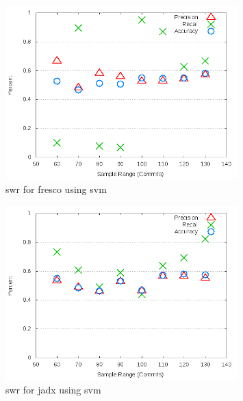 \begin{figure}[!t]
\centering
\includegraphics[width=0.8\textwidth]{images/svm/test_1/fresco_sample_range.png}
\caption{\gls{swr} for fresco using \gls{svm}}
\label{fig:test_1_fresco_svm}
\end{figure}

\begin{figure}[!t]
\centering
\includegraphics[width=0.8\textwidth]{images/svm/test_1/jadx_sample_range.png}
\caption{\gls{swr} for jadx using \gls{svm}}
\label{fig:test_1_jadx_svm}
\end{figure}

